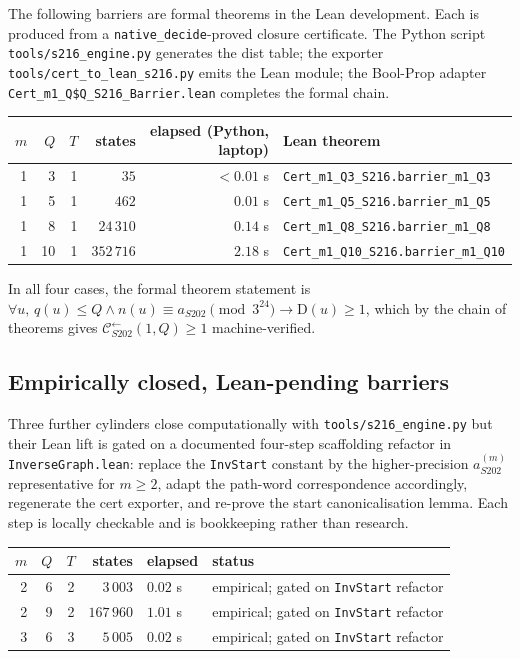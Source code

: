 \documentclass[11pt,a4paper]{article}
\theoremstyle{plain}
\theoremstyle{definition}
\newcommand{\aS}{a_{S202}}
\newcommand{\aSat}{a_{S202}^{(m)}}
\newcommand{\defect}{\mathrm{D}}
\newcommand{\Cback}{\mathcal{C}^{\!\leftarrow}_{S202}}
\begin{document}
The following barriers are formal theorems in the Lean development.
Each is produced from a \texttt{native\_decide}-proved closure
certificate. The Python script \texttt{tools/s216\_engine.py}
generates the dist table; the exporter
\texttt{tools/cert\_to\_lean\_s216.py} emits the Lean module; the
Bool-Prop adapter \texttt{Cert\_m1\_Q\$Q\_S216\_Barrier.lean}
completes the formal chain.

\begin{center}\small
\begin{tabular}{rrrrrl}
\toprule
$m$ & $Q$ & $T$ & states & elapsed (Python, laptop) & Lean theorem \\
\midrule
1 & 3  & 1 & $35$       & $<0.01$ s & \texttt{Cert\_m1\_Q3\_S216.barrier\_m1\_Q3} \\
1 & 5  & 1 & $462$      & $0.01$ s  & \texttt{Cert\_m1\_Q5\_S216.barrier\_m1\_Q5} \\
1 & 8  & 1 & $24\,310$  & $0.14$ s  & \texttt{Cert\_m1\_Q8\_S216.barrier\_m1\_Q8} \\
1 & 10 & 1 & $352\,716$ & $2.18$ s  & \texttt{Cert\_m1\_Q10\_S216.barrier\_m1\_Q10} \\
\bottomrule
\end{tabular}
\end{center}

In all four cases, the formal theorem statement is
\(
  \forall u, \,
  q(u) \le Q \wedge n(u) \equiv \aS \pmod{3^{24}}
  \to
  \defect(u) \ge 1
\),
which by the chain of theorems gives
$\Cback(1, Q) \ge 1$ machine-verified.

\subsection{Empirically closed, Lean-pending barriers}

Three further cylinders close computationally with
\texttt{tools/s216\_engine.py} but their Lean lift is gated on a
documented four-step scaffolding refactor in
\texttt{InverseGraph.lean}: replace the \texttt{InvStart} constant
by the higher-precision $\aSat$ representative for $m \ge 2$,
adapt the path-word correspondence accordingly, regenerate the
cert exporter, and re-prove the start canonicalisation lemma. Each
step is locally checkable and is bookkeeping rather than research.

\begin{center}\small
\begin{tabular}{rrrrll}
\toprule
$m$ & $Q$ & $T$ & states & elapsed & status \\
\midrule
2 & 6 & 2 & $3\,003$    & $0.02$ s & empirical; gated on \texttt{InvStart} refactor \\
2 & 9 & 2 & $167\,960$  & $1.01$ s & empirical; gated on \texttt{InvStart} refactor \\
3 & 6 & 3 & $5\,005$    & $0.02$ s & empirical; gated on \texttt{InvStart} refactor \\
\bottomrule
\end{tabular}
\end{center}
\end{document}
